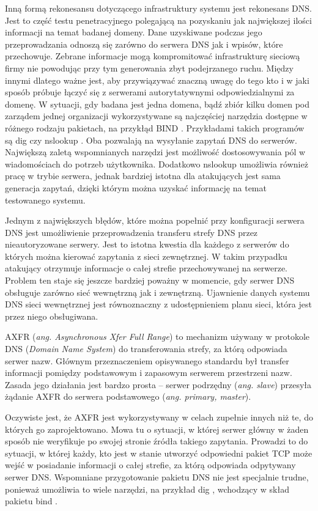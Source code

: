 Inną formą rekonesansu dotyczącego infrastruktury systemu jest rekonesans DNS. Jest to część testu penetracyjnego polegającą na pozyskaniu jak największej ilości informacji na temat badanej domeny.
Dane uzyskiwane podczas jego przeprowadzania odnoszą się zarówno do serwera DNS jak i wpisów, które przechowuje. Zebrane informacje mogą
kompromitować infrastrukturę sieciową firmy nie powodując przy tym generowania zbyt podejrzanego ruchu. Między innymi dlatego
ważne jest, aby przywiązywać znaczną uwagę do tego kto i w jaki sposób próbuje łączyć się z serwerami autorytatywnymi odpowiedzialnymi
za domenę. W sytuacji, gdy badana jest jedna domena, bądź zbiór kilku domen pod zarządem jednej organizacji wykorzystywane są najczęściej
narzędzia dostępne w różnego rodzaju pakietach, na przykłąd BIND \cite{isc}. Przykładami takich programów są dig \cite{dig} czy
nslookup \cite{domain_example}. Oba pozwalają na wysyłanie zapytań DNS do serwerów. Największą zaletą wspomnianych narzędzi jest
możliwość dostosowywania pól w wiadomościach do potrzeb użytkownika. Dodatkowo nslookup umożliwia również pracę w trybie serwera,
jednak bardziej istotna dla atakujących jest sama generacja zapytań, dzięki którym można uzyskać informację na temat testowanego
systemu.

Jednym z największych błędów, które można popełnić przy konfiguracji serwera DNS jest umożliwienie przeprowadzenia transferu strefy
DNS przez nieautoryzowane serwery. Jest to istotna kwestia dla każdego z serwerów do których można kierować zapytania z sieci zewnętrznej.
W takim przypadku atakujący otrzymuje informacje o całej strefie przechowywanej na serwerze. Problem ten staje się jeszcze bardziej
poważny w momencie, gdy serwer DNS obsługuje zarówno sieć wewnętrzną jak i zewnętrzną. Ujawnienie danych systemu DNS sieci
wewnętrznej jest równoznaczny z udostępnieniem planu sieci, która jest przez niego obsługiwana.


AXFR (\textit{ang. Asynchronous Xfer Full Range}) \cite{RFC1034, RFC1035} to mechanizm używany w protokole DNS (\textit{Domain Name System}) do
transferowania strefy, za którą odpowiada serwer nazw. Głównym przeznaczeniem opisywanego standardu był transfer informacji pomiędzy
podstawowym i zapasowym serwerem przestrzeni nazw. Zasada jego działania jest bardzo prosta -- serwer podrzędny (\textit{ang. slave})
przesyła żądanie AXFR do serwera podstawowego (\textit{ang. primary, master}).

Oczywiste jest, że AXFR jest wykorzystywany w celach zupełnie innych niż te, do których go zaprojektowano. Mowa tu o sytuacji,
w której serwer główny w żaden sposób nie weryfikuje po swojej stronie źródła takiego zapytania. Prowadzi to do sytuacji, w której
każdy, kto jest w stanie utworzyć odpowiedni pakiet TCP może wejść w posiadanie informacji o całej strefie, za którą odpowiada
odpytywany serwer DNS. Wspomniane przygotowanie pakietu DNS nie jest specjalnie trudne, ponieważ umożliwia to wiele narzędzi, na
przykład dig \cite{dig}, wchodzący w skład pakietu bind \cite{isc}.

